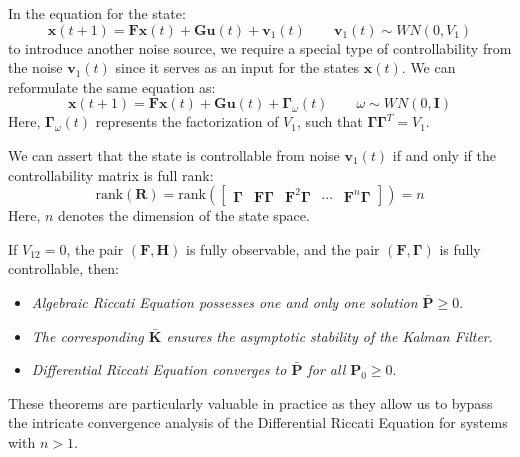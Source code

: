 In the equation for the state:
\[\mathbf{x}(t+1)=\mathbf{Fx}(t)+\mathbf{Gu}(t)+\mathbf{v}_1(t) \qquad \mathbf{v}_1(t)\sim WN(0,V_1)\]
to introduce another noise source, we require a special type of controllability from the noise $\mathbf{v}_1(t)$ since it serves as an input for the states $\mathbf{x}(t)$. 
We can reformulate the same equation as:
\[\mathbf{x}(t+1)=\mathbf{Fx}(t)+\mathbf{Gu}(t)+\boldsymbol{\Gamma}_\omega(t) \qquad \omega\sim WN(0,\mathbf{I})\]
Here, $\boldsymbol{\Gamma}_\omega(t)$ represents the factorization of $V_1$, such that $\boldsymbol{\Gamma\Gamma}^T=V_1$.

We can assert that the state is controllable from noise $\mathbf{v}_1(t)$ if and only if the controllability matrix is full rank:
\[\text{rank}(\mathbf{R})=\text{rank}\left(\begin{bmatrix} \boldsymbol{\Gamma} & \mathbf{F}\boldsymbol{\Gamma} & \mathbf{F}^2\boldsymbol{\Gamma} & \cdots & \mathbf{F}^n\boldsymbol{\Gamma} \end{bmatrix} \right)=n\]
Here, $n$ denotes the dimension of the state space.
\begin{theorem}
    If $V_{12}=0$, the pair $(\mathbf{F},\mathbf{H})$ is fully observable, and the pair $(\mathbf{F},\boldsymbol{\Gamma})$ is fully controllable, then:
\end{theorem}  
\begin{itemize}
    \item \textit{Algebraic Riccati Equation possesses one and only one solution $\bar{\mathbf{P}}\geq 0$}. 
    \item \textit{The corresponding $\bar{\mathbf{K}}$ ensures the asymptotic stability of the Kalman Filter}. 
    \item \textit{Differential Riccati Equation converges to $\bar{\mathbf{P}}$ for all $\mathbf{P}_0\geq 0$}. 
\end{itemize}
These theorems are particularly valuable in practice as they allow us to bypass the intricate convergence analysis of the Differential Riccati Equation for systems with $n>1$.